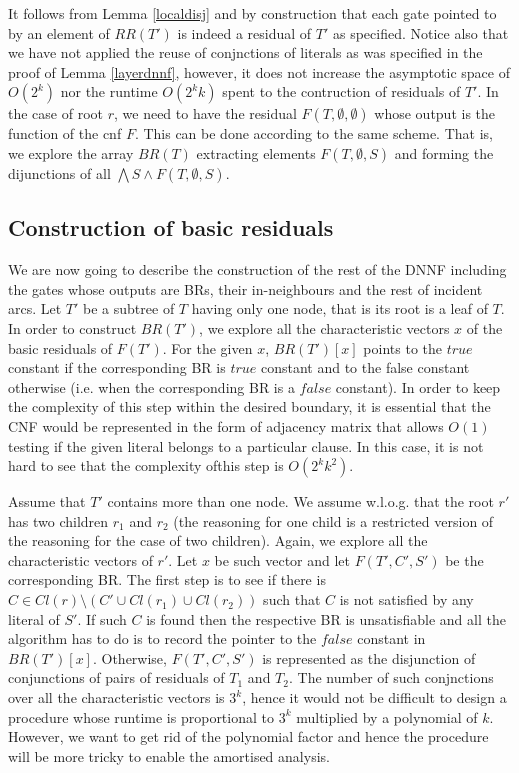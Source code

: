 \documentclass{llncs}
\begin{document}
It follows from Lemma \ref{localdisj} and by construction that each gate pointed to by an element of
$RR(T')$ is indeed a residual of $T'$ as specified. Notice also that we have not applied the reuse of
conjnctions of literals as was specified in the proof of Lemma \ref{layerdnnf}, however, it does not
increase the asymptotic space of $O(2^k)$ nor the runtime $O(2^kk)$ spent to the contruction of residuals
of $T'$. In the case of root $r$, we need to have the residual $F(T,\emptyset,\emptyset)$ whose
output is the function of the {\sc cnf} $F$. This can be done according to the same scheme.
That is, we explore the array $BR(T)$ extracting elements $F(T,\emptyset,S)$ and forming the dijunctions
of all $\bigwedge S \wedge F(T,\emptyset,S)$.

\subsection{Construction of basic residuals}
We are now going to describe the construction of the rest of the DNNF including the gates whose outputs
are BRs, their in-neighbours and the rest of incident arcs. Let $T'$ be a subtree of $T$ having only one
node, that is its root is a leaf of $T$. In order to construct $BR(T')$, we explore all the characteristic
vectors $x$ of the basic residuals of $F(T')$. For the given $x$, $BR(T')[x]$ points to the $true$ constant
if the corresponding BR is $true$ constant and to the false constant otherwise (i.e. when the corresponding
BR is a $false$ constant). In order to keep the complexity of this step within the desired boundary, it is
essential that the CNF would be represented in the form of adjacency matrix that allows $O(1)$ testing
if the given literal belongs to a particular clause. In this case, it is not hard to see that the complexity
ofthis step is $O(2^kk^2)$. 

Assume that $T'$ contains more than one node. We assume w.l.o.g. that the root $r'$ has two children
$r_1$ and $r_2$ (the reasoning for one child is a restricted version of the reasoning for the case of
two children). Again, we explore all the characteristic vectors of $r'$. Let $x$ be such vector and
let $F(T',C',S')$ be the corresponding BR. The first step is to see if there is $C \in Cl(r) \setminus (C' \cup Cl(r_1) \cup Cl(r_2))$
such that $C$ is not satisfied by any literal of $S'$. If such $C$ is found then the respective BR is unsatisfiable
and all the algorithm has to do is to record the pointer to the $false$ constant in $BR(T')[x]$.
Otherwise, $F(T',C',S')$ is represented as the disjunction of conjunctions of pairs of residuals of $T_1$ and $T_2$.
The number of such conjnctions over all the characteristic vectors is $3^k$, hence it would not be difficult to
design a procedure whose runtime is proportional to $3^k$ multiplied by a polynomial of $k$. However, we want
to get rid of the polynomial factor and hence the procedure will be more tricky to enable the amortised analysis.
\end{document}
